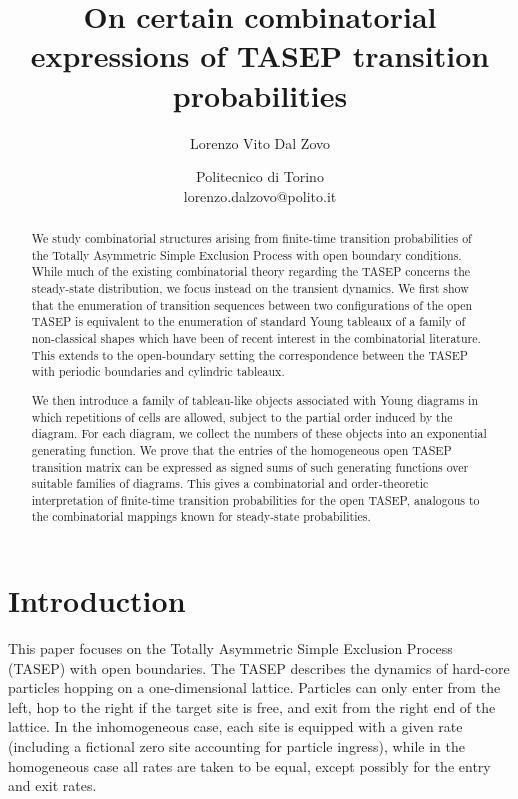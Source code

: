 \documentclass{article}
\title{On certain combinatorial expressions of TASEP transition
probabilities}
\author{Lorenzo Vito Dal Zovo}
\date{Politecnico di Torino\\
    lorenzo.dalzovo@polito.it}
\begin{document}
\newtheorem{theorem}{Theorem}
\newtheorem{corollary}{Corollary}
\newtheorem{lemma}{Lemma}

\maketitle

\begin{abstract}

We study combinatorial structures arising from finite-time transition probabilities of the Totally Asymmetric Simple Exclusion Process with open boundary conditions. While much of the existing combinatorial theory regarding the TASEP concerns the steady-state distribution, we focus instead on the transient dynamics. We first show that the enumeration of transition sequences between two configurations of the open TASEP is equivalent to the enumeration of standard Young tableaux of a family of non-classical shapes which have been of recent interest in the combinatorial literature. This extends to the open-boundary setting the correspondence between the TASEP with periodic boundaries and cylindric tableaux.

We then introduce a family of tableau-like objects associated with Young diagrams in which repetitions of cells are allowed, subject to the partial order induced by the diagram. For each diagram, we collect the numbers of these objects into an exponential generating function. We prove that the entries of the homogeneous open TASEP transition matrix can be expressed as signed sums of such generating functions over suitable families of diagrams. This gives a combinatorial and order-theoretic interpretation of finite-time transition probabilities for the open TASEP, analogous to the combinatorial mappings known for steady-state probabilities.



\end{abstract}


\section{Introduction}
This paper focuses on the Totally Asymmetric Simple Exclusion Process (TASEP) with open boundaries. The TASEP describes the dynamics of hard-core particles hopping on a one-dimensional lattice. Particles can only enter from the left, hop to the right if the target site is free, and exit from the right end of the lattice. In the inhomogeneous case, each site is equipped with a given rate (including a fictional zero site accounting for particle ingress), while in the homogeneous case all rates are taken to be equal, except possibly for the entry and exit rates.
\end{document}
